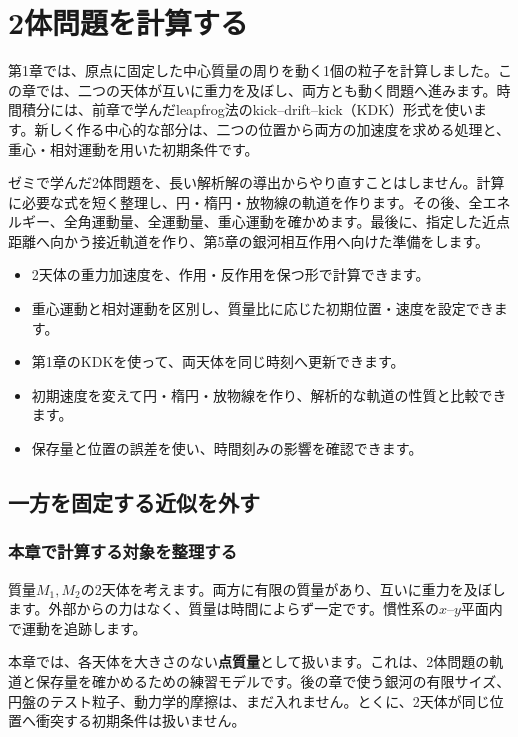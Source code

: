 \chapter{2体問題を計算する}
\label{chap:two-body}
第1章では、原点に固定した中心質量の周りを動く1個の粒子を計算しました。この章では、二つの天体が互いに重力を及ぼし、両方とも動く問題へ進みます。時間積分には、前章で学んだleapfrog法のkick--drift--kick（KDK）形式を使います。新しく作る中心的な部分は、二つの位置から両方の加速度を求める処理と、重心・相対運動を用いた初期条件です。

ゼミで学んだ2体問題を、長い解析解の導出からやり直すことはしません。計算に必要な式を短く整理し、円・楕円・放物線の軌道を作ります。その後、全エネルギー、全角運動量、全運動量、重心運動を確かめます。最後に、指定した近点距離へ向かう接近軌道を作り、第5章の銀河相互作用へ向けた準備をします。

\begin{goalbox}[この章で学ぶこと]
\begin{itemize}
\item 2天体の重力加速度を、作用・反作用を保つ形で計算できます。
\item 重心運動と相対運動を区別し、質量比に応じた初期位置・速度を設定できます。
\item 第1章のKDKを使って、両天体を同じ時刻へ更新できます。
\item 初期速度を変えて円・楕円・放物線を作り、解析的な軌道の性質と比較できます。
\item 保存量と位置の誤差を使い、時間刻みの影響を確認できます。
\end{itemize}
\end{goalbox}

\section{一方を固定する近似を外す}
\label{sec:ch2-model}
\subsection{本章で計算する対象を整理する}
質量$M_1,M_2$の2天体を考えます。両方に有限の質量があり、互いに重力を及ぼします。外部からの力はなく、質量は時間によらず一定です。慣性系の$x$--$y$平面内で運動を追跡します。

本章では、各天体を大きさのない\textbf{点質量}として扱います。これは、2体問題の軌道と保存量を確かめるための練習モデルです。後の章で使う銀河の有限サイズ、円盤のテスト粒子、動力学的摩擦は、まだ入れません。とくに、2天体が同じ位置へ衝突する初期条件は扱いません。

